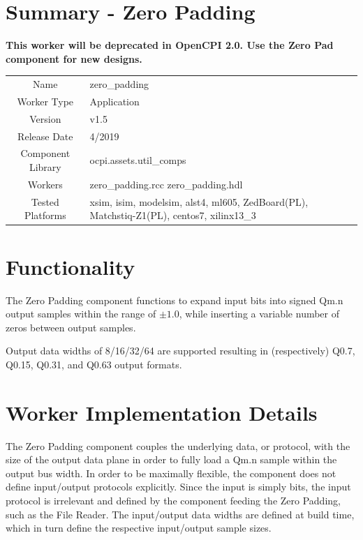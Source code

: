 \documentclass{article}
\author{} %
\date{Version \docVersion} %
\title{\docTitle}
\def\docVersion{1.5}
\def\comp{zero\_padding}
\def\Comp{Zero Padding}
\begin{document}
\section*{Summary - \Comp}
\textbf{This worker will be deprecated in OpenCPI 2.0. Use the Zero Pad component for new designs.}\\

\begin{tabular}{|c|M{13.5cm}|}
	\hline
	                  &                                                                                            \\
	\hline
	Name              & \comp                                                                                      \\
	\hline
	Worker Type       & Application                                                                                \\
	\hline
	Version           & v\docVersion \\
	\hline
	Release Date      & 4/2019 \\
	\hline
	Component Library & ocpi.assets.util\_comps                                                                     \\
	\hline
	Workers           & \comp.rcc \comp.hdl                                                                        \\
	\hline
	Tested Platforms  & xsim, isim, modelsim, alst4, ml605, ZedBoard(PL), Matchstiq-Z1(PL), centos7, xilinx13\_3 \\
	\hline
\end{tabular}

\section*{Functionality}
\begin{flushleft}
	The {\Comp} component functions to expand input bits into signed Qm.n output samples within the range of $\pm1.0$, while inserting a variable number of zeros between output samples.\medskip

	Output data widths of 8/16/32/64 are supported resulting in (respectively) Q0.7, Q0.15, Q0.31, and Q0.63 output formats.
\end{flushleft}

\section*{Worker Implementation Details}
\begin{flushleft}
	The {\Comp} component couples the underlying data, or protocol, with the size of the output data plane in order to fully load a Qm.n sample within the output bus width. In order to be maximally flexible, the component does not define input/output protocols explicitly. Since the input is simply bits, the input protocol is irrelevant and defined by the component feeding the Zero Padding, such as the File Reader. The input/output data widths are defined at build time, which in turn define the respective input/output sample sizes.
\end{flushleft}
\end{document}

